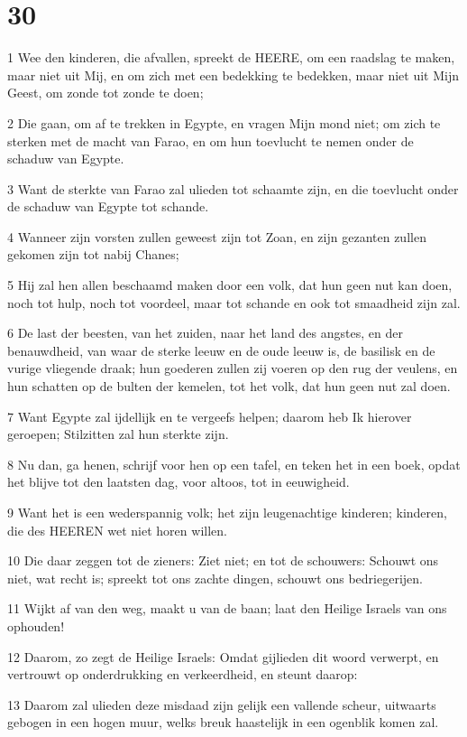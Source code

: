 \chapter{30}

\par 1 Wee den kinderen, die afvallen, spreekt de HEERE, om een raadslag te maken, maar niet uit Mij, en om zich met een bedekking te bedekken, maar niet uit Mijn Geest, om zonde tot zonde te doen;
\par 2 Die gaan, om af te trekken in Egypte, en vragen Mijn mond niet; om zich te sterken met de macht van Farao, en om hun toevlucht te nemen onder de schaduw van Egypte.
\par 3 Want de sterkte van Farao zal ulieden tot schaamte zijn, en die toevlucht onder de schaduw van Egypte tot schande.
\par 4 Wanneer zijn vorsten zullen geweest zijn tot Zoan, en zijn gezanten zullen gekomen zijn tot nabij Chanes;
\par 5 Hij zal hen allen beschaamd maken door een volk, dat hun geen nut kan doen, noch tot hulp, noch tot voordeel, maar tot schande en ook tot smaadheid zijn zal.
\par 6 De last der beesten, van het zuiden, naar het land des angstes, en der benauwdheid, van waar de sterke leeuw en de oude leeuw is, de basilisk en de vurige vliegende draak; hun goederen zullen zij voeren op den rug der veulens, en hun schatten op de bulten der kemelen, tot het volk, dat hun geen nut zal doen.
\par 7 Want Egypte zal ijdellijk en te vergeefs helpen; daarom heb Ik hierover geroepen; Stilzitten zal hun sterkte zijn.
\par 8 Nu dan, ga henen, schrijf voor hen op een tafel, en teken het in een boek, opdat het blijve tot den laatsten dag, voor altoos, tot in eeuwigheid.
\par 9 Want het is een wederspannig volk; het zijn leugenachtige kinderen; kinderen, die des HEEREN wet niet horen willen.
\par 10 Die daar zeggen tot de zieners: Ziet niet; en tot de schouwers: Schouwt ons niet, wat recht is; spreekt tot ons zachte dingen, schouwt ons bedriegerijen.
\par 11 Wijkt af van den weg, maakt u van de baan; laat den Heilige Israels van ons ophouden!
\par 12 Daarom, zo zegt de Heilige Israels: Omdat gijlieden dit woord verwerpt, en vertrouwt op onderdrukking en verkeerdheid, en steunt daarop:
\par 13 Daarom zal ulieden deze misdaad zijn gelijk een vallende scheur, uitwaarts gebogen in een hogen muur, welks breuk haastelijk in een ogenblik komen zal.
